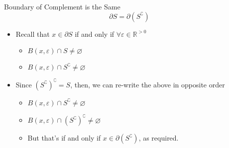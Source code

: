 \documentclass{standalone}
\begin{document}
\begin{theo*}{Boundary of Complement is the Same}
  \[
    \partial S = \partial \left( S ^{\complement}   \right)
  \]
  \begin{pf}
    \begin{itemize}
    \item Recall that $x \in \partial S$ if and only if $ \forall \varepsilon  \in \mathbb{R}^{>0} $
      \begin{itemize}
        \item $ B\left(x, \varepsilon \right) \cap S \neq  \varnothing$ 
        \item $ B\left(x, \varepsilon \right) \cap S ^{\complement} \neq \varnothing$ 
      \end{itemize}
    \item Since $ \left( S ^{\complement}  \right) ^{\complement} = S$, then, we can re-write the above in opposite order 
      \begin{itemize}
        \item $ B\left(x, \varepsilon \right) \cap S ^{\complement} \neq \varnothing$ 
        \item $ B\left(x, \varepsilon \right) \cap \left( S ^{\complement}  \right) ^\complement  \neq  \varnothing$ 
        \item But that's if and only if $ x \in \partial \left( S ^{\complement}  \right)$, as required. 
      \end{itemize}
    \end{itemize}
  \end{pf}
\end{theo*}
\end{document}
